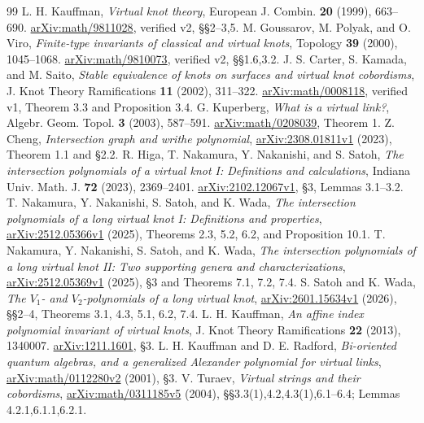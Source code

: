 \documentclass[12pt]{amsart}
\theoremstyle{definition}
\theoremstyle{remark}
\numberwithin{equation}{section}
\begin{document}
\begin{thebibliography}{99}
 L. H. Kauffman, \emph{Virtual knot theory},
European J. Combin. \textbf{20} (1999), 663--690.
\href{https://arxiv.org/abs/math/9811028}{arXiv:math/9811028},
verified v2, \S\S2--3,5.
 M. Goussarov, M. Polyak, and O. Viro,
\emph{Finite-type invariants of classical and virtual knots},
Topology \textbf{39} (2000), 1045--1068.
\href{https://arxiv.org/abs/math/9810073}{arXiv:math/9810073},
verified v2, \S\S1.6,3.2.
 J. S. Carter, S. Kamada, and M. Saito,
\emph{Stable equivalence of knots on surfaces and virtual knot cobordisms},
J. Knot Theory Ramifications \textbf{11} (2002), 311--322.
\href{https://arxiv.org/abs/math/0008118}{arXiv:math/0008118},
verified v1, Theorem 3.3 and Proposition 3.4.
 G. Kuperberg, \emph{What is a virtual link?},
Algebr. Geom. Topol. \textbf{3} (2003), 587--591.
\href{https://arxiv.org/abs/math/0208039}{arXiv:math/0208039}, Theorem 1.
 Z. Cheng, \emph{Intersection graph and writhe polynomial},
\href{https://arxiv.org/abs/2308.01811}{arXiv:2308.01811v1} (2023),
Theorem 1.1 and \S2.2.
 R. Higa, T. Nakamura, Y. Nakanishi, and S. Satoh,
\emph{The intersection polynomials of a virtual knot I: Definitions and calculations},
Indiana Univ. Math. J. \textbf{72} (2023), 2369--2401.
\href{https://arxiv.org/abs/2102.12067}{arXiv:2102.12067v1},
\S3, Lemmas 3.1--3.2.
 T. Nakamura, Y. Nakanishi, S. Satoh, and K. Wada,
\emph{The intersection polynomials of a long virtual knot I: Definitions and properties},
\href{https://arxiv.org/abs/2512.05366}{arXiv:2512.05366v1} (2025),
Theorems 2.3, 5.2, 6.2, and Proposition 10.1.
 T. Nakamura, Y. Nakanishi, S. Satoh, and K. Wada,
\emph{The intersection polynomials of a long virtual knot II: Two supporting genera and characterizations},
\href{https://arxiv.org/abs/2512.05369}{arXiv:2512.05369v1} (2025),
\S3 and Theorems 7.1, 7.2, 7.4.
 S. Satoh and K. Wada,
\emph{The $V_1$- and $V_2$-polynomials of a long virtual knot},
\href{https://arxiv.org/abs/2601.15634}{arXiv:2601.15634v1} (2026),
\S\S2--4, Theorems 3.1, 4.3, 5.1, 6.2, 7.4.
 L. H. Kauffman,
\emph{An affine index polynomial invariant of virtual knots},
J. Knot Theory Ramifications \textbf{22} (2013), 1340007.
\href{https://arxiv.org/abs/1211.1601}{arXiv:1211.1601}, \S3.
 L. H. Kauffman and D. E. Radford,
\emph{Bi-oriented quantum algebras, and a generalized Alexander polynomial for virtual links},
\href{https://arxiv.org/abs/math/0112280}{arXiv:math/0112280v2} (2001), \S3.
 V. Turaev, \emph{Virtual strings and their cobordisms},
\href{https://arxiv.org/abs/math/0311185}{arXiv:math/0311185v5} (2004),
\S\S3.3(1),4.2,4.3(1),6.1--6.4; Lemmas 4.2.1,6.1.1,6.2.1.
\end{thebibliography}
\end{document}

